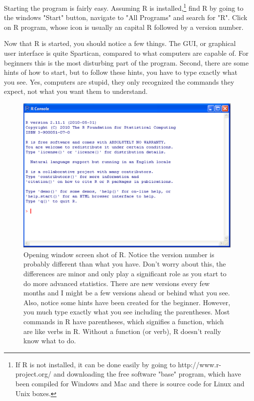 \documentclass{tufte-handout}\usepackage[]{graphicx}\usepackage[]{xcolor}
\begin{document}
Starting the program is fairly easy. Assuming R is installed,\footnote[][.03in]{If R is not installed, it can be done easily by going to http://www.r-project.org/ and downloading the free software "base" program, which have been compiled for Windows and Mac and there is source code for Linux and Unix boxes.} find R by going to the windows "Start" button, navigate to "All Programs" and search for "R". Click on R program, whose icon is usually an capital R followed by a version number. 

Now that R is started, you should notice a few things.  The GUI, or graphical user interface is quite Spartican, compared to what computers are capable of. For beginners this is the most disturbing part of the program. Second, there are some hints of how to start, but to follow these hints, you have to type exactly what you see. Yes, computers are stupid, they only recognized the commands they expect, not what you want them to understand. 

\begin{figure}
		\includegraphics{OpeningScreenShot.pdf}
	\caption{Opening window screen shot of R. Notice the version number is probably different than what you have. Don't worry about this, the differences are minor and only play a significant role as you start to do more advanced statistics. There are new versions every few months and I might be a few versions ahead or behind what you see. Also, notice some hints have been created for the beginner. However, you much type exactly what you see including the parentheses. Most commands in R have parentheses, which signifies a function, which are like verbs in R. Without a function (or verb), R doesn't really know what to do.}
	\label{fig:OpeningScreenShot}
\end{figure}
\end{document}
